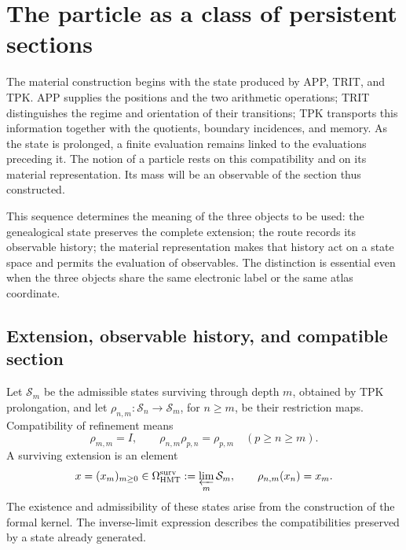 \section{The particle as a class of persistent sections}
\label{vi:vi:sec:particula}

The material construction begins with the state produced by APP, TRIT, and
TPK. APP supplies the positions and the two arithmetic operations;
TRIT distinguishes the regime and orientation of their transitions; TPK
transports this information together with the quotients, boundary incidences,
and memory. As the state is prolonged, a finite evaluation
remains linked to the evaluations preceding it. The notion of a
particle rests on this compatibility and on its material representation.
Its mass will be an observable of the section thus constructed.

This sequence determines the meaning of the three objects to be
used: the genealogical state preserves the complete extension; the route
records its observable history; the material representation makes
that history act on a state space and permits the evaluation of observables.
The distinction is essential even when the three objects share
the same electronic label or the same atlas coordinate.

\subsection{Extension, observable history, and compatible section}
\label{vi:vi:subsec:extension-persistente}

Let $\mathcal S_m$ be the admissible states surviving through depth
$m$, obtained by TPK prolongation, and let
$\rho_{n,m}:\mathcal S_n\to\mathcal S_m$, for $n\geq m$, be their
restriction maps. Compatibility of refinement means
\begin{equation}
 \rho_{m,m}=I,\qquad
 \rho_{n,m}\rho_{p,n}=\rho_{p,m}\quad(p\geq n\geq m).
 \label{vi:vi:eq:sistema-estados}
\end{equation}
A surviving extension is an element
\begin{equation}
 x=(x_m)_{m\geq0}\in\Omega^{\mathrm{surv}}_{\mathrm{HMT}}
 :=\varprojlim_m\mathcal S_m,
 \qquad \rho_{n,m}(x_n)=x_m.
 \label{vi:vi:eq:extension-superviviente}
\end{equation}
The existence and admissibility of these states arise from the
construction of the formal kernel. The inverse-limit expression describes
the compatibilities preserved by a state already generated.

